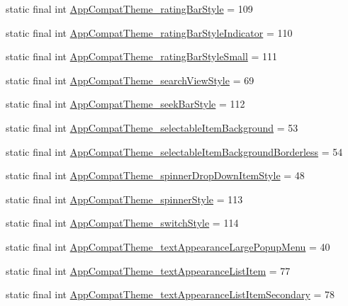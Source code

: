 \begin{CompactItemize}
\item 
static final int \hyperlink{classandroid_1_1support_1_1v4_1_1_r_1_1styleable_03df554f42548e6c63fa0608aaba9647}{AppCompatTheme\_\-ratingBarStyle} = 109
\item 
static final int \hyperlink{classandroid_1_1support_1_1v4_1_1_r_1_1styleable_8ba7f811197cd79ba92bd8c7919d4936}{AppCompatTheme\_\-ratingBarStyleIndicator} = 110
\item 
static final int \hyperlink{classandroid_1_1support_1_1v4_1_1_r_1_1styleable_267c7cd6a0c6a2c317ac9a33722b06eb}{AppCompatTheme\_\-ratingBarStyleSmall} = 111
\item 
static final int \hyperlink{classandroid_1_1support_1_1v4_1_1_r_1_1styleable_4c487a848b41d29bf3dc21719d968cd6}{AppCompatTheme\_\-searchViewStyle} = 69
\item 
static final int \hyperlink{classandroid_1_1support_1_1v4_1_1_r_1_1styleable_feb452e918c5ee9d2dc74ac8a5370e9d}{AppCompatTheme\_\-seekBarStyle} = 112
\item 
static final int \hyperlink{classandroid_1_1support_1_1v4_1_1_r_1_1styleable_ca3ef3993e097a2b6d8407610c33068d}{AppCompatTheme\_\-selectableItemBackground} = 53
\item 
static final int \hyperlink{classandroid_1_1support_1_1v4_1_1_r_1_1styleable_113f8fa7701e681a079ae443df1e2758}{AppCompatTheme\_\-selectableItemBackgroundBorderless} = 54
\item 
static final int \hyperlink{classandroid_1_1support_1_1v4_1_1_r_1_1styleable_2214d9a18b7e5f85a1399a543215d936}{AppCompatTheme\_\-spinnerDropDownItemStyle} = 48
\item 
static final int \hyperlink{classandroid_1_1support_1_1v4_1_1_r_1_1styleable_07bdf94f02decf6c8be39649927ee6ad}{AppCompatTheme\_\-spinnerStyle} = 113
\item 
static final int \hyperlink{classandroid_1_1support_1_1v4_1_1_r_1_1styleable_b500f751fdb168654edc56fa5b3f9455}{AppCompatTheme\_\-switchStyle} = 114
\item 
static final int \hyperlink{classandroid_1_1support_1_1v4_1_1_r_1_1styleable_96bd7ab78a1b2db3505d8f14a3ca0737}{AppCompatTheme\_\-textAppearanceLargePopupMenu} = 40
\item 
static final int \hyperlink{classandroid_1_1support_1_1v4_1_1_r_1_1styleable_942cd40a2b7ea9d627e07dc8a7b02152}{AppCompatTheme\_\-textAppearanceListItem} = 77
\item 
static final int \hyperlink{classandroid_1_1support_1_1v4_1_1_r_1_1styleable_c4014b38c2c4cc12f0ebf7d747ad85fc}{AppCompatTheme\_\-textAppearanceListItemSecondary} = 78

\end{CompactItemize}
